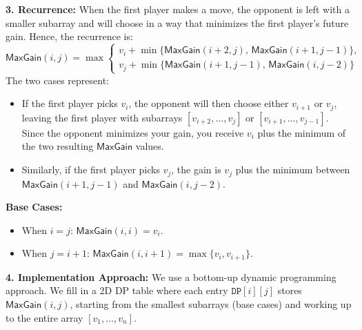 \documentclass[11pt]{article}
\begin{document}
        \textbf{3. Recurrence:}  
        When the first player makes a move, the opponent is left with a smaller subarray and will choose in a way that minimizes the first player's future gain. Hence, the recurrence is:
        \[
        \mathsf{MaxGain}(i,j) = \max\left\{
        \begin{array}{l}
        v_i + \min\{\mathsf{MaxGain}(i+2,j),\, \mathsf{MaxGain}(i+1,j-1)\},\\[1mm]
        v_j + \min\{\mathsf{MaxGain}(i+1,j-1),\, \mathsf{MaxGain}(i,j-2)\}
        \end{array}
        \right.
        \]
        The two cases represent:
        \begin{itemize}
            \item If the first player picks \(v_i\), the opponent will then choose either \(v_{i+1}\) or \(v_j\), leaving the first player with subarrays \([v_{i+2},\dots,v_j]\) or \([v_{i+1},\dots,v_{j-1}]\). Since the opponent minimizes your gain, you receive \(v_i\) plus the minimum of the two resulting \(\mathsf{MaxGain}\) values.
            \item Similarly, if the first player picks \(v_j\), the gain is \(v_j\) plus the minimum between \(\mathsf{MaxGain}(i+1,j-1)\) and \(\mathsf{MaxGain}(i,j-2)\).
        \end{itemize}
        
        \textbf{Base Cases:}  
        \begin{itemize}
            \item When \(i = j\): \(\mathsf{MaxGain}(i,i) = v_i\).
            \item When \(j = i+1\): \(\mathsf{MaxGain}(i,i+1) = \max\{v_i, v_{i+1}\}\).
        \end{itemize}
        
        \bigskip
        
        \textbf{4. Implementation Approach:}  
        We use a bottom-up dynamic programming approach. We fill in a 2D DP table where each entry \(\texttt{DP}[i][j]\) stores \(\mathsf{MaxGain}(i,j)\), starting from the smallest subarrays (base cases) and working up to the entire array \([v_1,\dots,v_n]\).
        
        \bigskip
        
\end{document}
